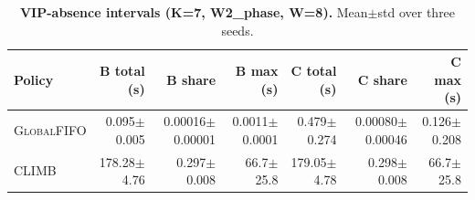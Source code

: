 \begin{table}[h]
\centering
\caption{\textbf{\textsf{VIP}-absence intervals (K=7, W2\_phase, W=8).} Mean$\pm$std over three seeds.}
\label{tab:vip_absence}
\small
\setlength{\tabcolsep}{6pt}
\begin{tabular}{l r r r r r r}
\toprule
Policy & B total (s) & B share & B max (s) & C total (s) & C share & C max (s) \\
\midrule
\textsc{GlobalFIFO} & 0.095$\pm$0.005 & 0.00016$\pm$0.00001 & 0.0011$\pm$0.0001 & 0.479$\pm$0.274 & 0.00080$\pm$0.00046 & 0.126$\pm$0.208 \\
\textsc{CLIMB}  & 178.28$\pm$4.76 & 0.297$\pm$0.008 & 66.7$\pm$25.8 & 179.05$\pm$4.78 & 0.298$\pm$0.008 & 66.7$\pm$25.8 \\
\bottomrule
\end{tabular}
\end{table}

